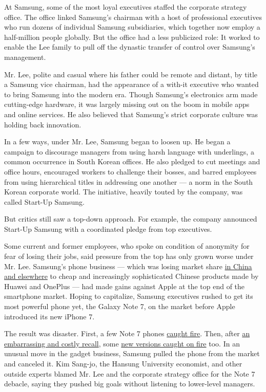 At Samsung, some of the most loyal executives staffed the corporate
strategy office. The office linked Samsung's chairman with a host of
professional executives who run dozens of individual Samsung
subsidiaries, which together now employ a half-million people globally.
But the office had a less publicized role: It worked to enable the Lee
family to pull off the dynastic transfer of control over Samsung's
management.

Mr. Lee, polite and casual where his father could be remote and distant,
by title a Samsung vice chairman, had the appearance of a with-it
executive who wanted to bring Samsung into the modern era. Though
Samsung's electronics arm made cutting-edge hardware, it was largely
missing out on the boom in mobile apps and online services. He also
believed that Samsung's strict corporate culture was holding back
innovation.

In a few ways, under Mr. Lee, Samsung began to loosen up. He began a
campaign to discourage managers from using harsh language with
underlings, a common occurrence in South Korean offices. He also pledged
to cut meetings and office hours, encouraged workers to challenge their
bosses, and barred employees from using hierarchical titles in
addressing one another --- a norm in the South Korean corporate world.
The initiative, heavily touted by the company, was called Start-Up
Samsung.

But critics still saw a top-down approach. For example, the company
announced Start-Up Samsung with a coordinated pledge from top
executives.

Some current and former employees, who spoke on condition of anonymity
for fear of losing their jobs, said pressure from the top has only grown
worse under Mr. Lee. Samsung's phone business --- which was losing
market share
\href{https://www.nytimes.com/2015/04/02/technology/personaltech/with-galaxy-s6-and-s6-edge-samsung-tries-to-regain-its-footing.html}{in
China and elsewhere} to cheap and increasingly sophisticated Chinese
products made by Huawei and OnePlus --- had made gains against Apple at
the top end of the smartphone market. Hoping to capitalize, Samsung
executives rushed to get its most powerful phone yet, the Galaxy Note 7,
on the market before Apple introduced its new iPhone 7.

The result was disaster. First, a few Note 7 phones
\href{https://www.nytimes.com/2016/09/10/technology/samsung-galaxy-consumer-product-safety.html}{caught
fire}. Then, after
\href{https://www.nytimes.com/2016/09/03/business/samsung-galaxy-note-battery.html}{an
embarrassing and costly recall}, some
\href{https://www.nytimes.com/2016/10/11/business/samsung-galaxy-note-fires.html}{new
versions caught on fire} too. In an unusual move in the gadget business,
Samsung pulled the phone from the market and canceled it. Kim Sang-jo,
the Hansung University economist, and other outside experts blamed Mr.
Lee and the corporate strategy office for the Note 7 debacle, saying
they pushed big goals without listening to lower-level managers.

